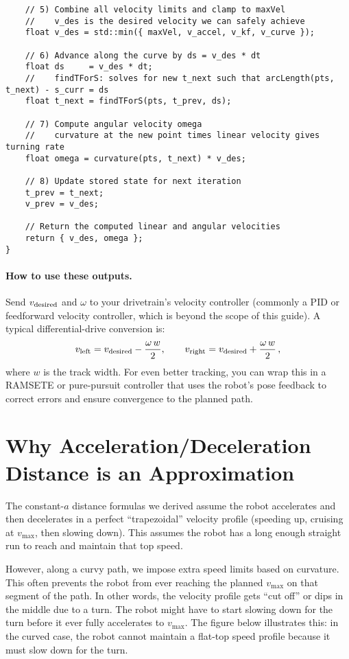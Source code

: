 \documentclass[11pt]{article}
\begin{document}
\begin{lstlisting}
    // 5) Combine all velocity limits and clamp to maxVel
    //    v_des is the desired velocity we can safely achieve
    float v_des = std::min({ maxVel, v_accel, v_kf, v_curve });

    // 6) Advance along the curve by ds = v_des * dt
    float ds     = v_des * dt;
    //    findTForS: solves for new t_next such that arcLength(pts, t_next) - s_curr = ds
    float t_next = findTForS(pts, t_prev, ds);

    // 7) Compute angular velocity omega
    //    curvature at the new point times linear velocity gives turning rate
    float omega = curvature(pts, t_next) * v_des;

    // 8) Update stored state for next iteration
    t_prev = t_next;
    v_prev = v_des;

    // Return the computed linear and angular velocities
    return { v_des, omega };
}
\end{lstlisting}

\paragraph{How to use these outputs.} Send \(v_{\rm desired}\) and \(\omega\) to your drivetrain’s velocity controller (commonly a PID or feedforward velocity controller, which is beyond the scope of this guide). A typical differential-drive conversion is:
\[
v_{\rm left}  = v_{\rm desired} - \frac{\omega\,w}{2},\qquad
v_{\rm right} = v_{\rm desired} + \frac{\omega\,w}{2}\,,
\] 
where $w$ is the track width. For even better tracking, you can wrap this in a RAMSETE or pure-pursuit controller that uses the robot’s pose feedback to correct errors and ensure convergence to the planned path.

\section{Why Acceleration/Deceleration Distance is an Approximation}

The constant-$a$ distance formulas we derived assume the robot accelerates and then decelerates in a perfect “trapezoidal” velocity profile (speeding up, cruising at $v_{\max}$, then slowing down). This assumes the robot has a long enough straight run to reach and maintain that top speed.

However, along a curvy path, we impose extra speed limits based on curvature. This often prevents the robot from ever reaching the planned $v_{\max}$ on that segment of the path. In other words, the velocity profile gets “cut off” or dips in the middle due to a turn. The robot might have to start slowing down for the turn before it ever fully accelerates to $v_{\max}$. The figure below illustrates this: in the curved case, the robot cannot maintain a flat-top speed profile because it must slow down for the turn.
\end{document}
